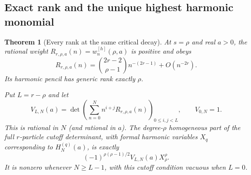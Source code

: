 \documentclass[11pt]{article}
\newtheorem{theorem}{Theorem}[section]
\theoremstyle{definition}
\theoremstyle{remark}
\numberwithin{equation}{section}
\begin{document}
\subsection{Exact rank and the unique highest harmonic monomial}

\begin{theorem}[Every rank at the same critical decay]
\label{hier:rank}
At $s=\rho$ and real $a>0$, the rational weight
$R_{r,\rho,a}(n)=w_n^{[h]}(\rho,a)$ is positive and obeys
\begin{equation}\label{hier:critical}
 R_{r,\rho,a}(n)=\binom{2r-2}{\rho-1}n^{-(2r-1)}
                                      +O(n^{-2r}).
\end{equation}
Its harmonic pencil has generic rank exactly $\rho$.

Put $L=r-\rho$ and let
\begin{equation}\label{hier:Vcutoff}
 V_{L,N}(a)=\det\left(
   \sum_{n=0}^N n^{i+j}R_{r,\rho,a}(n)\right)_{0\le i,j<L},
 \qquad V_{0,N}=1.
\end{equation}
This is rational in $N$ (and rational in $a$).  The degree-$\rho$
homogeneous part of the full $r$-particle cutoff determinant, with
formal harmonic variables $X_q$ corresponding to $H_N^{(q)}(a)$, is
exactly
\begin{equation}\label{hier:top}
 \boxed{\displaystyle
 (-1)^{\rho(\rho-1)/2}V_{L,N}(a)X_\rho^\rho.}
\end{equation}
It is nonzero whenever $N\ge L-1$, with this cutoff condition vacuous
when $L=0$.
\end{theorem}
\end{document}
